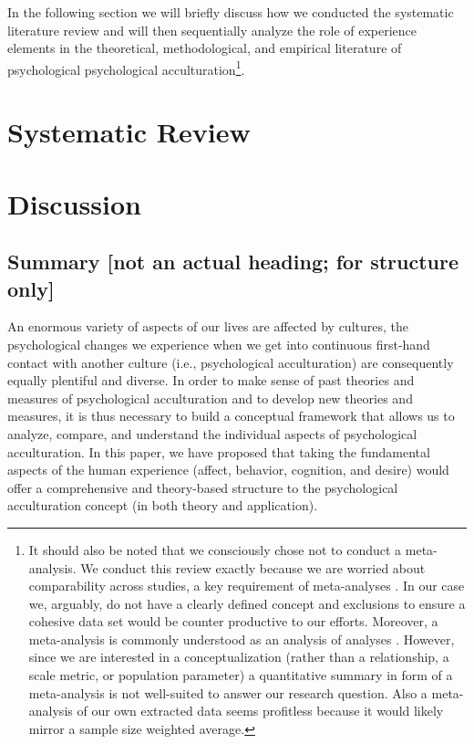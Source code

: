 \documentclass[man, 12pt, a4paper]{apa7}
\begin{document}
In the following section we will briefly discuss how we conducted the systematic literature review and will then sequentially analyze the role of experience elements in the theoretical, methodological, and empirical literature of psychological psychological acculturation\footnote{It should also be noted that we consciously chose not to conduct a meta-analysis. We conduct this review exactly because we are worried about comparability across studies, a key requirement of meta-analyses \citep{Pogue1998}. In our case we, arguably, do not have a clearly defined concept and exclusions to ensure a cohesive data set would be counter productive to our efforts. Moreover, a meta-analysis is commonly understood as an analysis of analyses \citep{Glass1976}. However, since we are interested in a conceptualization (rather than a relationship, a scale metric, or population parameter) a quantitative summary in form of a meta-analysis is not well-suited to answer our research question. Also a meta-analysis of our own extracted data seems profitless because it would likely mirror a sample size weighted average.}.

\section{Systematic Review}


\section{Discussion}

\subsection{Summary [not an actual heading; for structure only]}
An enormous variety of aspects of our lives are affected by cultures, the psychological changes we experience when we get into continuous first-hand contact with another culture (i.e., psychological acculturation) are consequently equally plentiful and diverse.
In order to make sense of past theories and measures of psychological acculturation and to develop new theories and measures, it is thus necessary to build a conceptual framework that allows us to analyze, compare, and understand the individual aspects of psychological acculturation.
In this paper, we have proposed that taking the fundamental aspects of the human experience (affect, behavior, cognition, and desire) would offer a comprehensive and theory-based structure to the psychological acculturation concept (in both theory and application).
\end{document}
